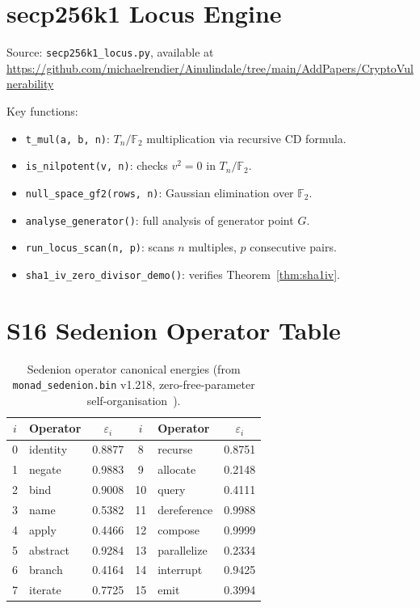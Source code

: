 \documentclass[runningheads]{llncs}
\theoremstyle{plain}
\theoremstyle{definition}
\newcommand{\GFtwo}{\mathbb{F}_2}
\begin{document}
\appendix

\section{secp256k1 Locus Engine}
\label{app:code}

Source: \texttt{secp256k1\_locus.py}, available at
\url{https://github.com/michaelrendier/Ainulindale/tree/main/AddPapers/CryptoVulnerability}

Key functions:
\begin{itemize}
\item \texttt{t\_mul(a, b, n)}: $T_n/\GFtwo$ multiplication via recursive CD formula.
\item \texttt{is\_nilpotent(v, n)}: checks $v^2 = 0$ in $T_n/\GFtwo$.
\item \texttt{null\_space\_gf2(rows, n)}: Gaussian elimination over $\GFtwo$.
\item \texttt{analyse\_generator()}: full analysis of generator point $G$.
\item \texttt{run\_locus\_scan(n, p)}: scans $n$ multiples, $p$ consecutive pairs.
\item \texttt{sha1\_iv\_zero\_divisor\_demo()}: verifies Theorem~\ref{thm:sha1iv}.
\end{itemize}

\section{S16 Sedenion Operator Table}
\label{app:s16}

\begin{table}[h]
\centering
\caption{Sedenion operator canonical energies (from \texttt{monad\_sedenion.bin} v1.218, zero-free-parameter self-organisation~\cite{Allison2026}).}
\label{tab:s16ops}
\begin{tabular}{clcclc}
\toprule
$i$ & Operator & $\varepsilon_i$ & $i$ & Operator & $\varepsilon_i$ \\
\midrule
0 & identity & 0.8877 & 8 & recurse & 0.8751 \\
1 & negate & 0.9883 & 9 & allocate & 0.2148 \\
2 & bind & 0.9008 & 10 & query & 0.4111 \\
3 & name & 0.5382 & 11 & dereference & 0.9988 \\
4 & apply & 0.4466 & 12 & compose & 0.9999 \\
5 & abstract & 0.9284 & 13 & parallelize & 0.2334 \\
6 & branch & 0.4164 & 14 & interrupt & 0.9425 \\
7 & iterate & 0.7725 & 15 & emit & 0.3994 \\
\bottomrule
\end{tabular}
\end{table}
\end{document}
